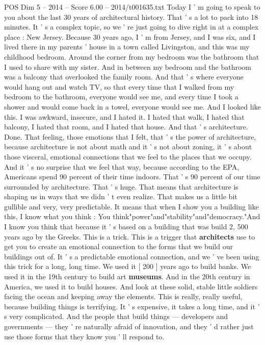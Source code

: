 \begin{textsample}{POS Dim 5 – 2014 – Score 6.00 – 2014/t001635.txt}  \label{ex:f5_pos_045}
Today I ' m going to speak to you about the last 30 years of architectural history.
That ' s a lot to pack into 18 minutes.
It ' s a complex topic, so we ' re just going to dive right in at a complex place : New Jersey.
Because 30 years ago, I ' m from Jersey, and I was six, and I lived there in my parents ' house in a town called Livingston, and this was my childhood bedroom.
Around the corner from my bedroom was the bathroom that I used to share with my sister.
And in between my bedroom and the bathroom was a balcony that overlooked the family room.
And that ' s where everyone would hang out and watch TV, so that every time that I walked from my bedroom to the bathroom, everyone would see me, and every time I took a shower and would come back in a towel, everyone would see me.
And I looked like this.
I was awkward, insecure, and I hated it.
I hated that walk, I hated that balcony, I hated that room, and I hated that house.
And that ' s architecture.
Done.
That feeling, those emotions that I felt, that ' s the power of architecture, because architecture is not about math and it ' s not about zoning, it ' s about those visceral, emotional connections that we feel to the places that we occupy.
And it ' s no surprise that we feel that way, because according to the EPA, Americans spend 90 percent of their time indoors.
That ' s 90 percent of our time surrounded by architecture.
That ' s huge.
That means that architecture is shaping us in ways that we didn ' t even realize.
That makes us a little bit gullible and very, very predictable.
It means that when I show you a building like this, I know what you think : You think"power"and"stability"and"democracy."And I know you think that because it ' s based on a building that was build 2, 500 years ago by the Greeks.
This is a trick.
This is a trigger that \textbf{architects} use to get you to create an emotional connection to the forms that we build our buildings out of.
It ' s a predictable emotional connection, and we ' ve been using this trick for a long, long time.
We used it [ 200 ] years ago to build banks.
We used it in the 19th century to build art \textbf{museums}.
And in the 20th century in America, we used it to build houses.
And look at these solid, stable little soldiers facing the ocean and keeping away the elements.
This is really, really useful, because building things is terrifying.
It ' s expensive, it takes a long time, and it ' s very complicated.
And the people that build things — developers and governments — they ' re naturally afraid of innovation, and they ' d rather just use those forms that they know you ' ll respond to.

\end{textsample}
